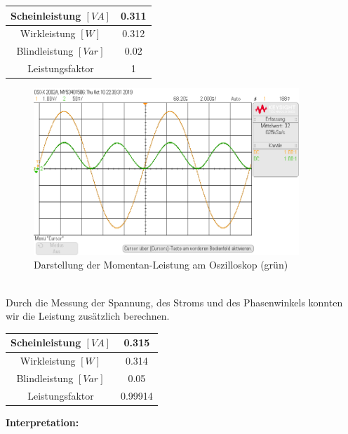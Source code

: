 \documentclass[a4paper,12pt]{article}
\begin{document}
	\begin{table}[h]
	\centering
		\begin{tabular}{|c|c|}
			\hline
			Scheinleistung $[VA]$ & 0.311 \\ \hline
			Wirkleistung $[W]$    & 0.312 \\ \hline
			Blindleistung $[Var]$ & 0.02  \\ \hline
			Leistungsfaktor         & 1     \\ \hline
		\end{tabular}
	\end{table}\newline
	\begin{figure}[h]
		\centering
		\includegraphics[width=10cm]{assets/momentan-leistung}
		\caption{Darstellung der Momentan-Leistung am Oszilloskop (grün)}
	\end{figure} \\ \newline
	Durch die Messung der Spannung, des Stroms und des Phasenwinkels konnten wir die Leistung zusätzlich berechnen.\newline
	\begin{table}[h]
	\centering
		\begin{tabular}{|c|c|}
			\hline
			Scheinleistung $[VA]$ & 0.315 \\ \hline
			Wirkleistung $[W]$    & 0.314 \\ \hline
			Blindleistung $[Var]$ & 0.05  \\ \hline
			Leistungsfaktor         & 0.99914     \\ \hline
		\end{tabular}
	\end{table}
	\newpage
	\noindent
	\textbf{Interpretation:} \\ \\
\end{document}
